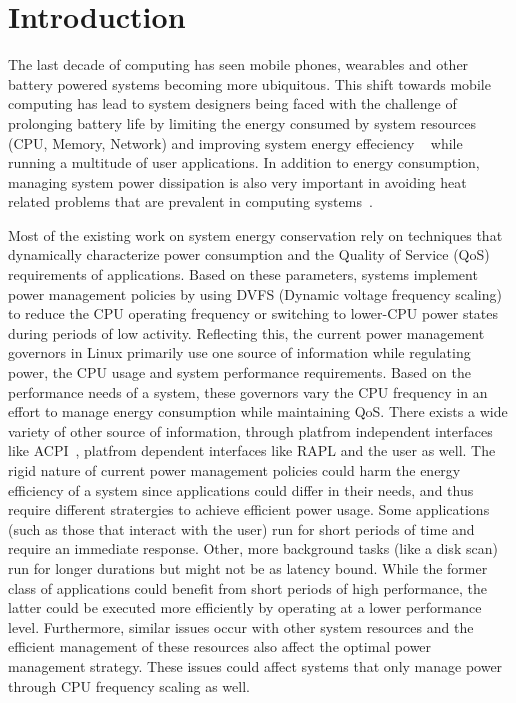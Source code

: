 \section{Introduction}\label{sec:intro}\label{sec:motiv}

The last decade of computing has seen mobile phones, wearables and other battery powered systems becoming 
more ubiquitous. This shift towards mobile computing has lead to system designers being faced with the  
challenge of prolonging battery life by limiting the energy consumed  
by system resources (CPU, Memory, Network) and improving system energy effeciency ~\cite{martin-bat, worldwide} while running a multitude of user applications. 
In addition to energy consumption, managing system power dissipation is also very 
important in avoiding heat related problems that are prevalent in computing systems~\cite{hybdtm}.

Most of the existing work on system energy conservation rely on techniques that  
dynamically characterize power consumption and the Quality of Service (QoS) requirements 
of applications. Based on these parameters, systems implement power management policies by 
using DVFS (Dynamic voltage frequency scaling)~\cite{dvfs} to reduce the CPU operating frequency or switching to lower-CPU power states~\cite{sleepscale, ecos} during periods of low activity.
Reflecting this, the current power management governors in Linux primarily use one source of 
information while regulating power, the CPU usage and system performance requirements. 
Based on the performance needs of a system, these governors vary the CPU frequency in an effort to manage energy consumption while maintaining QoS. 
There exists a wide variety of other source of information, through platfrom independent interfaces like ACPI~\cite{acpi, freqgov}, platfrom dependent interfaces like RAPL 
and the user as well. The rigid nature of current power management policies could harm the energy efficiency of a system since applications could differ in their needs, and thus 
require different stratergies to achieve efficient power usage. 
Some applications (such as those that interact with the user) run for short periods of time and require an immediate response. Other, more background tasks (like a disk scan) run for longer durations 
but might not be as latency bound.
While the former class of applications could benefit from short periods of high performance, the latter could be executed more efficiently by operating at a lower performance level. 
Furthermore, similar issues occur with other system resources and the efficient management of these resources also affect the optimal power management strategy. 
These issues could affect systems that only manage power through CPU frequency scaling as well.

